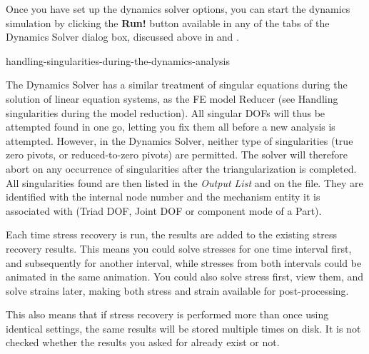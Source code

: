 
Once you have set up the dynamics solver options, you can start the dynamics
simulation by clicking the \textbf{Run!} button available in any of the tabs
of the Dynamics Solver dialog box, discussed above in
 and
.


           {handling-singularities-during-the-dynamics-analysis}

The Dynamics Solver has a similar treatment of singular equations during
the solution of linear equation systems, as the FE model Reducer (see
           {Handling singularities during the model reduction}).
All singular DOFs will thus be attempted found in one go, letting you fix
them all before a new analysis is attempted. However, in the Dynamics Solver,
neither type of singularities (true zero pivots, or reduced-to-zero pivots) are
permitted. The solver will therefore abort on any occurrence of singularities
after the triangularization is completed.
All singularities found are then listed in the {\sl Output List} and on the
 file. They are identified with the internal node number and the
mechanism entity it is associated with (Triad DOF, Joint DOF or component mode
of a Part).





Each time stress recovery is run, the results are added to the existing stress
recovery results. This means you could solve stresses for one time interval
first, and subsequently for another interval, while stresses from both intervals
could be animated in the same animation.
You could also solve stress first, view them, and solve strains later,
making both stress and strain available for post-processing.

This also means that if stress recovery is performed more than once using
identical settings, the same results will be stored multiple times on disk.
It is not checked whether the results you asked for already exist or not.

